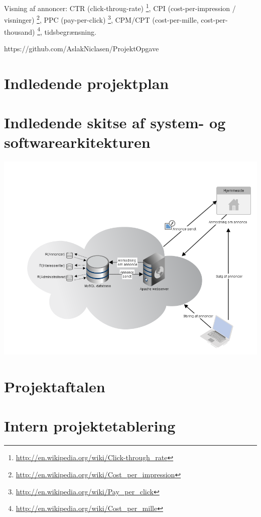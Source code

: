 \documentclass[a4paper,12pt]{article}
\begin{document}
Visning af annoncer: 
CTR (click-throug-rate) \footnote{\url{http://en.wikipedia.org/wiki/Click-through\_rate}}, CPI (cost-per-impression / visninger) \footnote{\url{http://en.wikipedia.org/wiki/Cost\_per\_impression}}, PPC (pay-per-click) \footnote{\url{http://en.wikipedia.org/wiki/Pay\_per\_click}}, CPM/CPT (cost-per-mille, cost-per-thousand) \footnote{\url{http://en.wikipedia.org/wiki/Cost\_per\_mille}}, tidsbegrænsning.

https://github.com/AslakNiclasen/ProjektOpgave

\section{Indledende projektplan}

\section{Indledende skitse af system- og softwarearkitekturen}

\includegraphics[width=\textwidth,height=\textheight,keepaspectratio]{architecture_diagram.png}

\section{Projektaftalen}

\section{Intern projektetablering}
\end{document}
